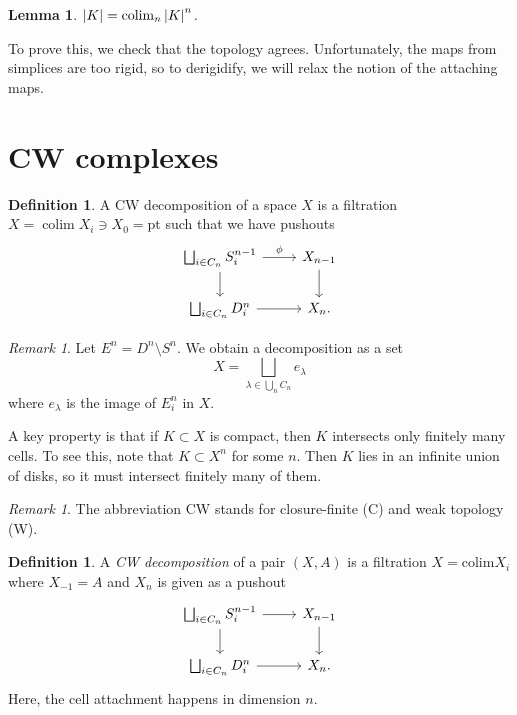 \documentclass[leqno, openany]{memoir}
\newtheorem{lem}[thm]{Lemma}
\theoremstyle{definition}
\newtheorem{defn}[thm]{Definition}
\theoremstyle{remark}
\newtheorem{rmk}[thm]{Remark}
\theoremstyle{plain}
\theoremstyle{definition}
\theoremstyle{remark}
\newcommand{\mr}[1]{\mathrm{#1}}
\begin{document}
\begin{lem}
    $\abs{K} = \operatorname{colim}_n \abs{K}^n$.
\end{lem}
To prove this, we check that the topology agrees. Unfortunately, the maps from simplices are too rigid, so to derigidify, we will relax the notion of the attaching maps.

\section{CW complexes}%
\label{sec:cw_complexes}

\begin{defn}
    A CW decomposition of a space $X$ is a filtration $X = \operatorname{colim} X_i \ni X_0 = \mr{pt}$ such that we have pushouts
    \begin{equation*}
    \begin{tikzcd}
        \bigsqcup_{i \in C_n} S_i^{n-1} \arrow{r}{\phi} \arrow{d} & X_{n-1} \arrow{d} \\
        \bigsqcup_{i \in C_n} D_i^n \arrow{r} & X_n.
    \end{tikzcd}
    \end{equation*}    
\end{defn}

\begin{rmk}
    Let $E^n = D^n \setminus S^n$. We obtain a decomposition as a set
    \[ X = \bigsqcup_{\lambda \in \bigcup_n C_n} e_{\lambda} \]
    where $e_{\lambda}$ is the image of $E_i^n$ in $X$.
\end{rmk}

A key property is that if $K \subset X$ is compact, then $K$ intersects only finitely many cells. To see this, note that $K \subset X^n$ for some $n$. Then $K$ lies in an infinite union of disks, so it must intersect finitely many of them.

\begin{rmk}
    The abbreviation CW stands for closure-finite (C) and weak topology (W).
\end{rmk}

\begin{defn}
    A \textit{CW decomposition} of a pair $(X,A)$ is a filtration $X = \mr{colim} X_i$ where $X_{-1} = A$ and $X_n$ is given as a pushout
    \begin{equation*}
    \begin{tikzcd}
        \bigsqcup_{i \in C_n} S_i^{n-1} \arrow{r} \arrow{d} & X_{n-1} \arrow{d} \\
        \bigsqcup_{i \in C_n} D_i^n \arrow{r} & X_n.
    \end{tikzcd}
    \end{equation*}
    Here, the cell attachment happens in dimension $n$.
\end{defn}
\end{document}
